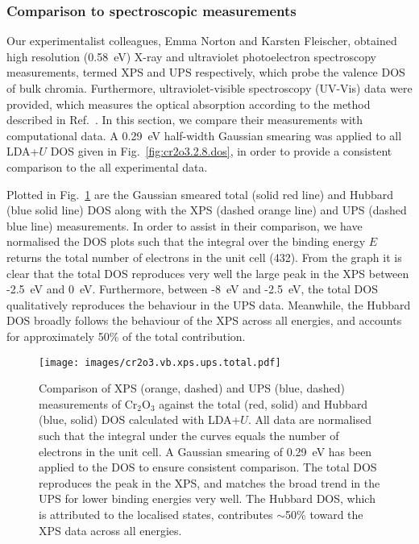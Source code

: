 \subsubsection{Comparison to spectroscopic measurements}
{
Our experimentalist colleagues, 
Emma Norton and Karsten Fleischer, 
obtained high resolution (0.58~eV)
X-ray and ultraviolet photoelectron 
spectroscopy measurements, 
termed XPS and UPS respectively, 
which probe the valence DOS of bulk chromia.
%
Furthermore, 
ultraviolet-visible spectroscopy (UV-Vis) data 
were provided,
which measures the optical absorption 
according to the method described in 
Ref.~\cite{PhysRevB.91.125202}.
%
In this section, 
we compare their measurements 
with computational data.}
%
A 0.29~eV half-width Gaussian smearing 
was applied to all LDA+$U$ DOS 
given in Fig.~\ref{fig:cr2o3.2.8.dos}, 
in order to provide a consistent comparison 
to the all experimental data.

Plotted in Fig.~\ref{fig:cr2o3.vb.xps.ups.total} 
are the Gaussian smeared 
total (solid red line) 
and Hubbard (blue solid line) DOS 
along with the XPS (dashed orange line) 
and UPS (dashed blue line) measurements.
%
In order to assist in their comparison, 
we have normalised the DOS plots   
such that the integral over the binding energy $E$ 
returns the total number of electrons in the unit cell (432).
%
From the graph it is clear that the total DOS 
reproduces very well the large peak in the XPS 
between -2.5~eV and 0~eV.
%
Furthermore, 
between -8~eV and -2.5~eV, 
the total DOS qualitatively reproduces 
the behaviour in the UPS data.
%
Meanwhile, 
the Hubbard DOS broadly follows 
the behaviour of the XPS across all energies, 
and accounts for approximately 
50\% of the total contribution. 

\begin{figure}[th!]
\centering
\texttt{[image: images/cr2o3.vb.xps.ups.total.pdf]}
\caption[Normalised XPS and UPS measurements of Cr$_2$O$_3$ compared to LDA+$U$
total DOS]
{Comparison of 
XPS (orange, dashed) and UPS (blue, dashed) 
measurements of Cr$_2$O$_3$
against the total (red, solid) and Hubbard (blue, solid) 
DOS calculated with LDA+$U$.
%
All data are normalised such that 
the integral under the curves equals 
the number of electrons in the unit cell.
%
A Gaussian smearing of 0.29~eV 
has been applied to the DOS 
to ensure consistent comparison.
%
The total DOS reproduces the peak in the XPS, 
and matches the broad trend in the UPS 
for lower binding energies very well.
%
{The Hubbard DOS,
which is attributed to the 
localised states, contributes} 
$\sim$50\% toward the XPS data 
across all energies.}
\label{fig:cr2o3.vb.xps.ups.total}
\end{figure}

